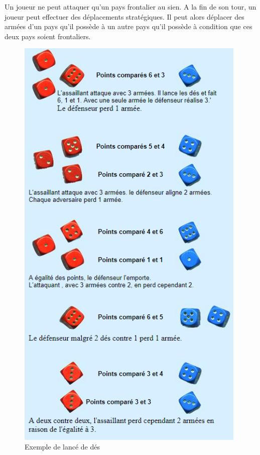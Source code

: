     Un joueur ne peut attaquer qu'un pays frontalier au sien. 
    \newline
    A la fin de son tour, un joueur peut effectuer des déplacements stratégiques. Il peut alors déplacer des armées d'un pays qu'il possède à un autre pays qu'il possède à condition que ces deux pays soient frontaliers.

\begin{figure}[!htbp]
        \centering
        \includegraphics[width=11cm]{Images/des_riskk.PNG}
        \caption{Exemple de lancé de dés}
    \end{figure}
\newpage 

